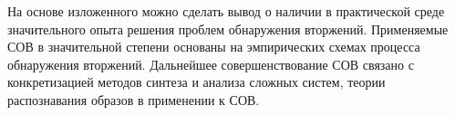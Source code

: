 На основе изложенного можно сделать вывод о наличии в практической среде значительного опыта
решения проблем обнаружения вторжений. Применяемые СОВ в значительной степени основаны на
эмпирических схемах процесса обнаружения вторжений. Дальнейшее совершенствование СОВ связано
с конкретизацией методов синтеза и анализа сложных систем, теории распознавания образов в
применении к СОВ.
